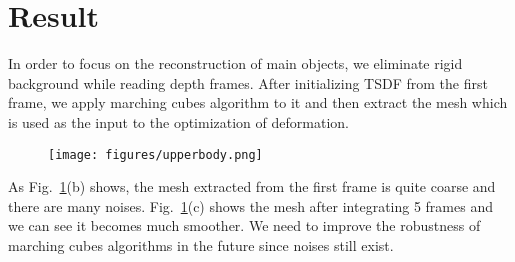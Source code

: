 \documentclass{article}
\begin{document}
\section{Result}
In order to focus on the reconstruction of main objects, we eliminate rigid background while reading depth frames. After initializing TSDF from the first frame, we apply marching cubes algorithm to it and then extract the mesh which is used as the input to the optimization of deformation. 
\begin{figure}[h]
\centering
\texttt{[image: figures/upperbody.png]}
\caption{ }
\label{fig:uppperbody}
\end{figure}
As Fig.~\ref{fig:uppperbody}(b) shows, the mesh extracted from the first frame is quite coarse and there are many noises. Fig.~\ref{fig:uppperbody}(c) shows the mesh after integrating 5 frames and we can see it becomes much smoother. We need to improve the robustness of marching cubes algorithms in the future since noises still exist. 



\end{document}

